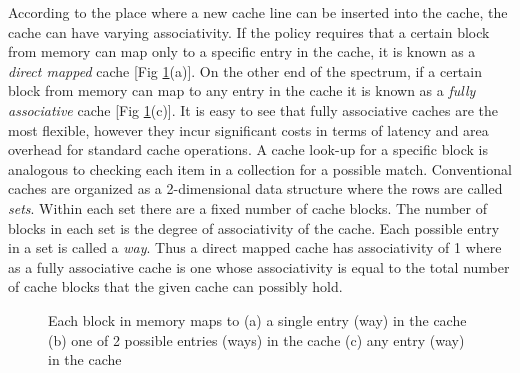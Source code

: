 According to the place where a new cache line can be inserted into the cache, the cache can have varying associativity. If the policy requires that a certain block from memory can map only to a specific entry in the cache, it is known as a \textit{direct mapped} cache [Fig \ref{fig:cache_associativity}(a)]. On the other end of the spectrum, if a certain block from memory can map to any entry in the cache it is known as a \textit{fully associative} cache [Fig \ref{fig:cache_associativity}(c)].  It is easy to see that fully associative caches are the most flexible, however they incur significant costs in terms of latency and area overhead for standard cache operations. A cache look-up for a specific block is analogous to checking each item in a collection for a possible match. Conventional caches are organized as a 2-dimensional data structure where the rows are called \textit{sets}. Within each set there are a fixed number of cache blocks. The number of blocks in each set is the degree of associativity of the cache. Each possible entry in a set is called a \textit{way}. Thus a direct mapped cache has associativity of 1 where as a fully associative cache is one whose associativity is equal to the total number of cache blocks that the given cache can possibly hold.  


\begin{figure}[h]
  \caption[Cache Associativity]{ Each block in memory maps to (a) a single entry (way) in the cache (b) one of 2 possible entries (ways) in the cache (c) any entry (way) in the cache}
  \label{fig:cache_associativity}
\end{figure}

